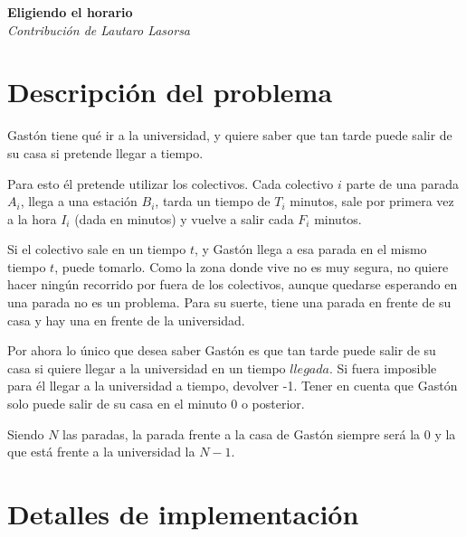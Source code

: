 \documentclass[fontsize=13pt, paper=a4, DIV=calc]{scrartcl}
\renewcommand*{\maketitle}{
	\begin{center}
		\textbf{\nombre}\\
		\textit{\footnotesize Contribución de \author}
	\end{center}
}
\begin{document}
\def\contest{OIA Certamen Nacional}
\def\nombre{Eligiendo el horario}
\def\author{Lautaro Lasorsa}
\def\niveldia{}
\def\numero{}
\def\archivo{horario}%
\def\version{}


\maketitle
\begin{multicols*}{2}

\section{Descripción del problema}

Gastón tiene qué ir a la universidad, y quiere saber que tan tarde puede salir de su casa si pretende llegar a tiempo.

Para esto él pretende utilizar los colectivos. Cada colectivo $i$ parte de una parada $A_{i}$, llega a una estación $B_{i}$, tarda un tiempo de $T_{i}$ minutos, sale por primera vez a la hora $I_{i}$ (dada en minutos) y vuelve a salir cada $F_{i}$ minutos. 

Si el colectivo sale en un tiempo $t$, y Gastón llega a esa parada en el mismo tiempo $t$, puede tomarlo. Como la zona donde vive no es muy segura, no quiere hacer ningún recorrido por fuera de los colectivos, aunque quedarse esperando en una parada no es un problema. Para su suerte, tiene una parada en frente de su casa y hay una en frente de la universidad. 

Por ahora lo único que desea saber Gastón es que tan tarde puede salir de su casa si quiere llegar a la universidad en un tiempo $llegada$. Si fuera imposible para él llegar a la universidad a tiempo, devolver -1. Tener en cuenta que Gastón solo puede salir de su casa en el minuto 0 o posterior. 

Siendo $N$ las paradas, la parada frente a la casa de Gastón siempre será la $0$ y la que está frente a la universidad la $N-1$. 

\section{Detalles de implementación}


\end{multicols*}
\end{document}
